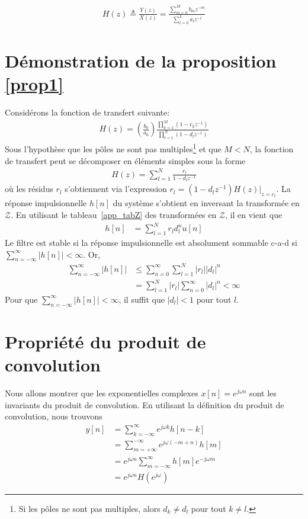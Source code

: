 \documentclass[11pt,a4paper]{IEEEtran}
\begin{document}
\begin{align*}
H(z)\triangleq \frac{Y(z)}{X(z)}=\frac{\sum_{m=0}^{M}b_m z^{-m}}{\sum_{l=0}^{L}a_l z^{-l}}
\end{align*}

\section{Démonstration de la proposition \ref{prop1}}
\label{dprop1}
Considérons la fonction de transfert suivante:
\begin{align*}
H(z)=\left(\frac{b_0}{a_0}\right)\frac{\prod_{k=1}^{M}(1-c_k z^{-1})}{\prod_{l=1}^{N}(1-d_l z^{-1})}
\end{align*}
Sous l'hypothèse que les pôles ne sont pas multiples\footnote{Si les pôles ne sont pas multiples, alors $d_k\ne d_l$ pour tout $k\ne l$.} et que $M<N$, la fonction de transfert peut se décomposer en éléments simples sous la forme
\begin{align}
H(z)=\sum_{l=1}^{N} \frac{r_l}{1-d_l z^{-1}}
\end{align}
où les résidus $r_l$ s'obtiennent via l'expression $r_l=(1-d_l z^{-1})H(z)|_{z=c_l}$. La réponse impulsionnelle $h[n]$ du système s'obtient en inversant la transformée en $\mathcal{Z}$. En utilisant le tableau~\ref{app_tabZ} des transformées en $\mathcal{Z}$, il en vient que 
\begin{align}
h[n]&=\sum_{l=1}^{N} r_l d_l^n u[n]
\end{align}
Le filtre est stable si la réponse impulsionnelle est absolument sommable c-a-d si $\sum_{n=-\infty}^{\infty}|h[n]|<\infty$. Or,
\begin{align}
\sum_{n=-\infty}^{\infty} |h[n]|&\le \sum_{n=0}^{\infty} \sum_{l=1}^{N} \left| r_l \right| \left|d_l \right|^n\\
&=\sum_{l=1}^{N} \left| r_l \right| \sum_{n=0}^{\infty}  \left|d_l \right|^n < \infty
\end{align}
Pour que $\sum_{n=-\infty}^{\infty}|h[n]|<\infty$, il suffit que $|d_l|<1$ pour tout $l$.


\section{Propriété du produit de convolution}
\label{dprop2}
Nous allons montrer que les exponentielles complexes $x[n]=e^{j\omega n}$ sont les invariants du produit de convolution. En utilisant la définition du produit de convolution, nous trouvons
\begin{align}
y[n]&= \sum_{k=-\infty}^{\infty}e^{j\omega k}h[n-k]\\
&= \sum_{m=+\infty}^{-\infty}e^{j\omega (-m+n)}h[m]\\
&= e^{j\omega n}\sum_{m=-\infty}^{\infty}h[m]e^{-j\omega m}\\
&= e^{j\omega n}H(e^{j\omega})
\end{align}
\end{document}
